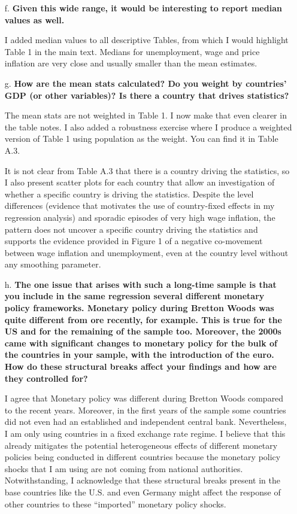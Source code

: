 \documentclass[12pt]{article}
\begin{document}
\begin{enumerate}
\begin{itemize}
    \item[f.] \textbf{Given this wide range, it would be interesting to report median values as well.}

I added median values to all descriptive Tables, from which I would highlight Table 1 in the main text. Medians for unemployment, wage and price inflation are very close and usually smaller than the mean estimates.

    \item[g.] \textbf{How are the mean stats calculated? Do you weight by countries' GDP (or other variables)? Is there a country that drives statistics?}

The mean stats are not weighted in Table 1. I now make that even clearer in the table notes. I also added a robustness exercise where I produce a weighted version of Table 1 using population as the weight. You can find it in Table A.3.

It is not clear from Table A.3 that there is a country driving the statistics, so I also present scatter plots for each country that allow an investigation of whether a specific country is driving the statistics. Despite the level differences (evidence that motivates the use of country-fixed effects in my regression analysis) and sporadic episodes of very high wage inflation, the pattern does not uncover a specific country driving the statistics and supports the evidence provided in Figure 1 of a negative co-movement between wage inflation and unemployment, even at the country level without any smoothing parameter.


    \item[h.] \textbf{The one issue that arises with such a long-time sample is that you include in the same regression several different monetary policy frameworks. Monetary policy during Bretton Woods was quite different from ore recently, for example. This is true for the US and for the remaining of the sample too. Moreover, the 2000s came with significant changes to monetary policy for the bulk of the countries in your sample, with the introduction of the euro. How do these structural breaks affect your findings and how are they controlled for?}

I agree that Monetary policy was different during Bretton Woods compared to the recent years. Moreover, in the first years of the sample some countries did not even had an established and independent central bank. Nevertheless, I am only using countries in a fixed exchange rate regime. I believe that this already mitigates the potential heterogeneous effects of different monetary policies being conducted in different countries because the monetary policy shocks that I am using are not coming from national authorities. Notwithstanding, I acknowledge that these structural breaks present in the base countries like the U.S. and even Germany might affect the response of other countries to these “imported” monetary policy shocks.


\end{itemize}
\end{enumerate}
\end{document}
